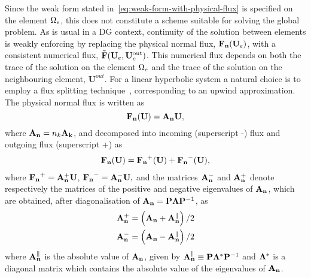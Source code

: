 Since the weak form stated in~\eqref{eq:weak-form-with-physical-flux} is specified on the element $\Omega_e$, this does not constitute a scheme suitable for solving the global problem. As is usual in a DG context, continuity of the solution between elements is weakly enforcing by replacing the physical normal flux, $\mathbf{\mathbf{F}_n}(\mathbf{U}_e)$, with a consistent numerical flux, $\tilde{\mathbf{F}}(\mathbf{U}_e,\mathbf{U}_e^{\textrm{out}})$. This numerical flux depends on both the trace of the solution on the element $\Omega_e$ and the trace of the solution on the neighbouring element, $\mathbf{U}^{out}$.
For a linear hyperbolic system a natural choice is to employ a flux splitting technique~\cite{DoneaHuerta:05}, corresponding to an upwind approximation\cite{CockburnCEM:05}.
The physical normal flux is written as
$$
\mathbf{\mathbf{F}_n}(\mathbf{U}) = \mathbf{A}_\mathbf{n} \mathbf{U},
$$
where $\mathbf{A}_\mathbf{n} = n_{k} \mathbf{A}_\mathbf{k}$, and decomposed into incoming (superscript -) flux and outgoing flux (superscript +) as
\begin{align}
\mathbf{\mathbf{F}_n}(\mathbf{U}) = \mathbf{\mathbf{F}_n}^+(\mathbf{U}) + \mathbf{\mathbf{F}_n}^-(\mathbf{U}),
\label{eq:phys-flux-splitting}
\end{align}
where $ \mathbf{\mathbf{F}_n}^+ = \mathbf{A}_\mathbf{n}^{+} \mathbf{U}$, $\mathbf{\mathbf{F}_n}^- = \mathbf{A}_\mathbf{n}^{-} \mathbf{U}, $ and the matrices $\mathbf{A}_\mathbf{n}^{-}$ and $\mathbf{A}_\mathbf{n}^{+}$ denote respectively the matrices of the positive and negative eigenvalues of $\mathbf{A}_\mathbf{n}$, which are obtained, after diagonalisation of $\mathbf{A}_\mathbf{n} = \mathbf{P} \mathbf{\Lambda} \mathbf{P}^{-1}$, as
\begin{align*}
\mathbf{A}_\mathbf{n}^{+} &= \left( \mathbf{A}_\mathbf{n} + \mathbf{A}_\mathbf{n}^{\parallel} \right) / 2   \\
\mathbf{A}_\mathbf{n}^{-} &= \left( \mathbf{A}_\mathbf{n} - \mathbf{A}_\mathbf{n}^{\parallel} \right) / 2
\end{align*}
where $\mathbf{A}_\mathbf{n}^{\parallel}$ is the absolute value of $\mathbf{A}_\mathbf{n}$, given by $\mathbf{A}_\mathbf{n}^{\parallel} \equiv \mathbf{P} \mathbf{\Lambda}^{*} \mathbf{P}^{-1}$ and $\mathbf{\Lambda}^{*}$ is a diagonal matrix which contains the absolute value of the eigenvalues of $\mathbf{A}_\mathbf{n}$.

